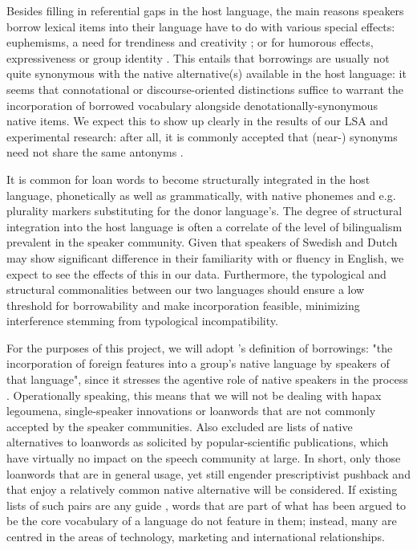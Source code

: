 \documentclass[a4paper]{article}
\begin{document}
Besides filling in referential gaps in the host language, the main reasons speakers borrow lexical items into their language have to do with various special effects: euphemisms, a need for trendiness and creativity \citep[cf.][]{Rebuck2002}; or for humorous effects, expressiveness or group identity \citep[cf.][]{Gottlieb2006,Wennberg2010}. 
This entails that borrowings are usually not quite synonymous with the native alternative(s) available in the host language: it seems that connotational or discourse-oriented distinctions suffice to warrant the incorporation of borrowed vocabulary alongside denotationally-synonymous native items. 
We expect this to show up clearly in the results of our LSA and experimental research: after all, it is commonly accepted that (near-) synonyms need not share the same antonyms \citep[cf.][]{Miller1990}. 

It is common for loan words to become structurally integrated in the host language, phonetically as well as grammatically, with native phonemes and e.g. plurality markers substituting for the donor language's.
The degree of structural integration into the host language is often a correlate of the level of bilingualism prevalent in the speaker community.
Given that speakers of Swedish and Dutch may show significant difference in their familiarity with or fluency in English, we expect to see the effects of this in our data.
Furthermore, the typological and structural commonalities between our two languages should ensure a low threshold for borrowability and make incorporation feasible, minimizing interference stemming from typological incompatibility.

For the purposes of this project, we will adopt \citet[p.37]{Thomason1988}'s definition of borrowings: "the incorporation of foreign features into a group's native language by speakers of that language", since it stresses the agentive role of native speakers in the process \citep[see also][p.12]{Winford2003}. 
Operationally speaking, this means that we will not be dealing with hapax legoumena, single-speaker innovations or loanwords that are not commonly accepted by the speaker communities. 
Also excluded are lists of native alternatives to loanwords as solicited by popular-scientific publications, which have virtually no impact on the speech community at large. 
In short, only those loanwords that are in general usage, yet still engender prescriptivist pushback and that enjoy a relatively common native alternative will be considered. 
If existing lists of such pairs are any guide \citep[cf.][]{Koops2009,Universitet2012}, words that are part of what has been argued to be the core vocabulary of a language \citep[see][]{Swadesh1955} do not feature in them; instead, many are centred in the areas of technology, marketing and international relationships. 
\end{document}
